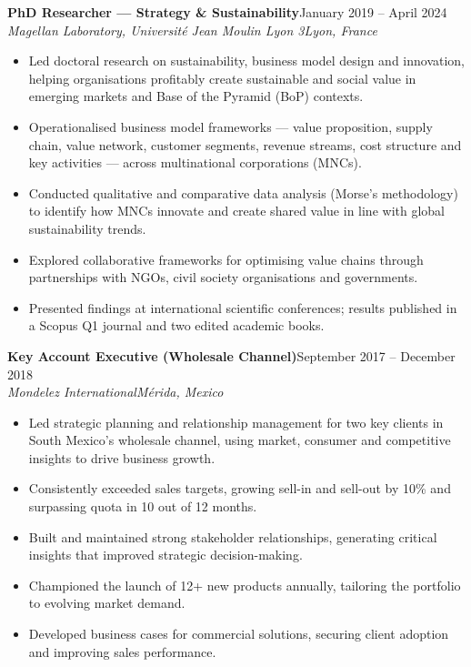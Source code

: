 \documentclass[10pt,a4paper]{article}
\newcommand{\job}[4]{%
  \vspace{0.3em}%
  \noindent\textbf{#1}\hfill #2\\[0.08em]
  \textit{#3}\hfill \textit{#4}\par
  \vspace{0.05em}%
}
\begin{document}
\job{PhD Researcher --- Strategy \& Sustainability}{January 2019 -- April 2024}{Magellan Laboratory, Universit\'e Jean Moulin Lyon 3}{Lyon, France}
\begin{itemize}
  \item Led doctoral research on sustainability, business model design and innovation, helping organisations profitably create sustainable and social value in emerging markets and Base of the Pyramid (BoP) contexts.
  \item Operationalised business model frameworks --- value proposition, supply chain, value network, customer segments, revenue streams, cost structure and key activities --- across multinational corporations (MNCs).
  \item Conducted qualitative and comparative data analysis (Morse's methodology) to identify how MNCs innovate and create shared value in line with global sustainability trends.
  \item Explored collaborative frameworks for optimising value chains through partnerships with NGOs, civil society organisations and governments.
  \item Presented findings at international scientific conferences; results published in a Scopus Q1 journal and two edited academic books.
\end{itemize}

\job{Key Account Executive (Wholesale Channel)}{September 2017 -- December 2018}{Mondelez International}{M\'erida, Mexico}
\begin{itemize}
  \item Led strategic planning and relationship management for two key clients in South Mexico's wholesale channel, using market, consumer and competitive insights to drive business growth.
  \item Consistently exceeded sales targets, growing sell-in and sell-out by 10\% and surpassing quota in 10 out of 12 months.
  \item Built and maintained strong stakeholder relationships, generating critical insights that improved strategic decision-making.
  \item Championed the launch of 12+ new products annually, tailoring the portfolio to evolving market demand.
  \item Developed business cases for commercial solutions, securing client adoption and improving sales performance.
\end{itemize}
\end{document}
